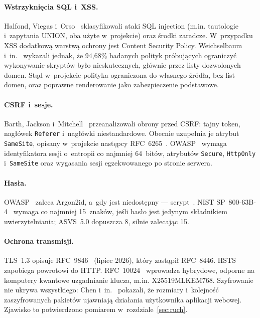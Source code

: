 \documentclass[12pt,a4paper]{article}
\newcommand{\kod}[1]{\texttt{#1}}
\begin{document}
\paragraph{Wstrzyknięcia SQL i~XSS.} Halfond, Viegas i~Orso~\cite{halfond} sklasyfikowali ataki SQL injection (m.in. tautologie i~zapytania UNION, oba użyte w~projekcie) oraz środki zaradcze. W~przypadku XSS dodatkową warstwą ochrony jest Content Security Policy. Weichselbaum i~in.~\cite{csp} wykazali jednak, że 94{,}68\% badanych polityk próbujących ograniczyć wykonywanie skryptów było nieskutecznych, głównie przez listy dozwolonych domen. Stąd w~projekcie polityka ograniczona do własnego źródła, bez list domen, oraz poprawne renderowanie jako zabezpieczenie podstawowe.

\paragraph{CSRF i~sesje.} Barth, Jackson i~Mitchell~\cite{barth} przeanalizowali obrony przed CSRF: tajny token, nagłówek \kod{Referer} i~nagłówki niestandardowe. Obecnie uzupełnia je atrybut \kod{SameSite}, opisany w~projekcie następcy RFC~6265~\cite{rfc6265,rfc6265bis}. OWASP~\cite{owaspsession} wymaga identyfikatora sesji o~entropii co najmniej 64~bitów, atrybutów \kod{Secure}, \kod{HttpOnly} i~\kod{SameSite} oraz wygasania sesji egzekwowanego po stronie serwera.

\paragraph{Hasła.} OWASP~\cite{owasppass} zaleca Argon2id, a~gdy jest niedostępny --- scrypt~\cite{rfc7914}. NIST SP~800-63B-4~\cite{nist} wymaga co najmniej 15~znaków, jeśli hasło jest jedynym składnikiem uwierzytelniania; ASVS~5.0 dopuszcza 8, silnie zalecając 15.

\paragraph{Ochrona transmisji.} TLS~1.3 opisuje RFC~9846~\cite{rfc9846} (lipiec 2026), który zastąpił RFC~8446. HSTS~\cite{rfc6797} zapobiega powrotowi do HTTP. RFC~10024~\cite{rfc10024} wprowadza hybrydowe, odporne na komputery kwantowe uzgadnianie klucza, m.in. X25519MLKEM768. Szyfrowanie nie ukrywa wszystkiego: Chen i~in.~\cite{chen} pokazali, że rozmiary i~kolejność zaszyfrowanych pakietów ujawniają działania użytkownika aplikacji webowej. Zjawisko to potwierdzono pomiarem w~rozdziale~\ref{sec:ruch}.
\end{document}
